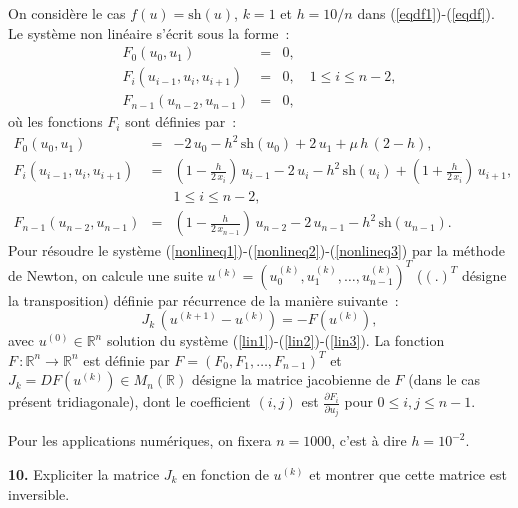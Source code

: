\documentclass[a4paper,10pt]{article}
\begin{document}
On consid\`ere le cas $f(u)=\mathrm{sh}(u)$, $k=1$ et $h=10/n$ dans (\ref{eqdf1})-(\ref{eqdf}).
Le syst\`eme non lin\'eaire s'\'ecrit sous la forme~:
\begin{eqnarray}
\label{nonlineq1}
F_0 (u_0 , u_1 )&=&0,\\
\label{nonlineq2}
F_i (u_{i-1} , u_i , u_{i+1} )&=&0, \quad 1\leq i \leq n-2 , \\ 
\label{nonlineq3}
F_{n-1} (u_{n-2} , u_{n-1} )&=&0,
\end{eqnarray}
o\`u les fonctions $F_i $ sont d\'efinies par~:
\begin{eqnarray}
\label{nonlinzero1}
F_0 (u_0 , u_1 )&=&
-2 \, u_0 - h^2 \, \mathrm{sh}(u_0) + 2\, u_1 +\mu\, h\, (2-h)
, \quad \quad\\
\label{nonlinzero2}
F_i (u_{i-1} , u_i , u_{i+1} )&=&
(1- \frac{h}{2\, x_i})\, u_{i-1}
-2 \, u_i -h^2 \, \mathrm{sh}(u_i )
+ (1+\frac{h}{2\, x_i})\, u_{i+1}, \quad\quad\\
\nonumber
 & &
1 \leq i \leq n-2 ,
\\
\label{nonlinzero3}
F_{n-1} (u_{n-2} , u_{n-1} )&=&
(1- \frac{h}{2\, x_{n-1}})\, u_{n-2}
-2 \, u_{n-1}-h^2 \, \mathrm{sh}(u_{n-1} ) .
\end{eqnarray}
Pour r\'esoudre le syst\`eme (\ref{nonlineq1})-(\ref{nonlineq2})-(\ref{nonlineq3}) par
la m\'ethode de Newton, on calcule une suite $u^{(k)}=(u_0^{(k)} , u_1^{(k)} , \ldots , u_{n-1}^{(k)})^T$
($(.)^T$ d\'esigne la transposition)
d\'efinie par r\'ecurrence de la mani\`ere suivante~:
\begin{equation}
\label{newtonscheme}
J_k \, (u^{(k+1)}-u^{(k)})= - F(u^{(k)}),
\end{equation}
avec $u^{(0)}\in \mathbb{R}^n$ solution du syst\`eme (\ref{lin1})-(\ref{lin2})-(\ref{lin3}).
La fonction $F\, : \mathbb{R}^n \rightarrow \mathbb{R}^n$ est d\'efinie par $F=(F_0 , F_1 , \ldots , F_{n-1})^T$
et $J_k = DF(u^{(k)}) \in M_{n}(\mathbb{R})$ d\'esigne la matrice jacobienne de $F$ (dans le cas pr\'esent tridiagonale), 
dont le coefficient $(i,j)$ est $\frac{\partial F_i}{\partial u_j}$ pour $0\leq i,j \leq n-1$.

\vspace{1ex}

Pour les applications num\'eriques, on fixera $n=1000$, c'est \`a dire
$h=10^{-2}$.

\vspace{1ex}

\noindent
{\bf 10.} Expliciter la matrice $J_k$ en fonction de $u^{(k)}$ et montrer que cette matrice est inversible.
\end{document}
